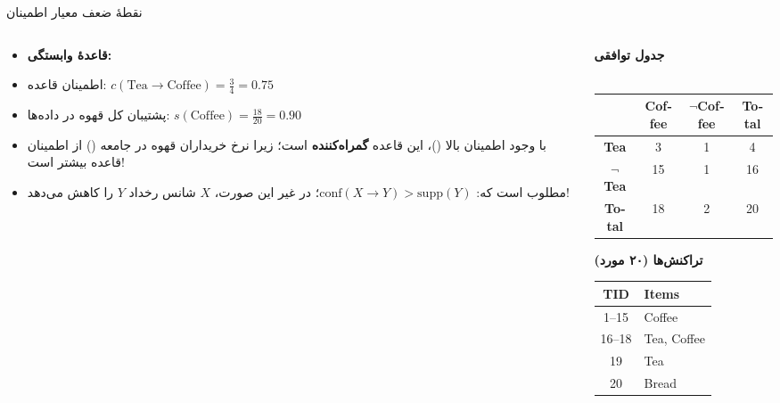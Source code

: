 \begin{frame}{نقطهٔ ضعف معیار اطمینان}{}
\begin{columns}[T,onlytextwidth]
\begin{column}{0.54\textwidth}
\begin{itemize}\setlength{\itemsep}{2.5pt}\small
    \item \textbf{قاعدهٔ وابستگی:} 
    \item اطمینان قاعده: $c(\text{Tea} \to \text{Coffee}) = \frac{3}{4} = 0.75$
    \item پشتیبان کل قهوه در داده‌ها: $s(\text{Coffee}) = \frac{18}{20} = 0.90$
    \item با وجود اطمینان بالا ()، این قاعده \alert{\textbf{گمراه‌کننده}} است؛ زیرا نرخ خریداران قهوه در جامعه () از اطمینان قاعده بیشتر است!
    \item مطلوب است که: $\mathrm{conf}(X \to Y) > \mathrm{supp}(Y)$؛ در غیر این صورت، $X$ شانس رخداد $Y$ را کاهش می‌دهد!
\end{itemize}
\end{column}%
\begin{column}{0.45\textwidth}
\centering
\textbf{\small جدول توافقی}\\[1pt]
{\scriptsize{}}\\[3pt]
\begin{latin}
\fontsize{7.5}{9.5}\selectfont
\begin{tabular}{|c|c|c|c|}
\hline
\rowcolor{mannheimblue!15}
 & \textbf{Coffee} & \textbf{$\neg$Coffee} & \textbf{Total} \\ \hline
\textbf{Tea} & 3 & 1 & 4 \\ \hline
\textbf{$\neg$Tea} & 15 & 1 & 16 \\ \hline
\textbf{Total} & 18 & 2 & 20 \\ \hline
\end{tabular}
\end{latin}

\vspace{0.1cm}
\textbf{\small تراکنش‌ها (۲۰ مورد)}\\[3pt]
\begin{latin}
\fontsize{7}{8.5}\selectfont
\begin{tabular}{|c|l|}
\hline
\rowcolor{mannheimblue!15}
\textbf{TID} & \textbf{Items} \\ \hline
1--15 & Coffee \\ \hline
16--18 & Tea, Coffee \\ \hline
19 & Tea \\ \hline
20 & Bread \\ \hline
\end{tabular}
\end{latin}
\end{column}
\end{columns}
\end{frame}

